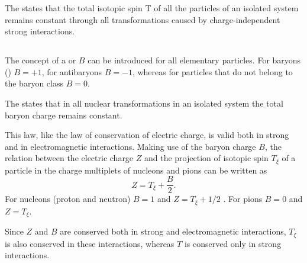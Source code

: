 The  states that the total isotopic spin T of all the particles of an isolated system remains constant through all transformations caused by charge-independent strong interactions.

\subsection{}\label{43.4.3} The concept of a  or  $B$ can be introduced for all elementary particles. For baryons () $B = +1$, for antibaryons $B = - 1$, whereas for particles that do not belong to the baryon class $B = 0$.

The  states that in all nuclear transformations in an isolated system the total baryon charge remains constant.

This law, like the law of conservation of electric charge, is valid both in strong and in electromagnetic interactions. Making use of the baryon charge $B$, the relation between the electric charge $Z$ and the projection of isotopic spin $T_{\xi}$ of a particle in the charge multiplets of nucleons and pions can be written as
\begin{equation*}%
Z = T_{\xi} + \frac{B}{2}.
\end{equation*}
For nucleons (proton and neutron) $B = 1$ and $Z = T_{\xi} + 1/2$ . For pions $B = 0$ and $Z = T_{\xi}$.

Since $Z$ and $B$ are conserved both in strong and electromagnetic interactions, $T_{\xi}$ is also conserved in these interactions, whereas $T$ is conserved only in strong interactions.

